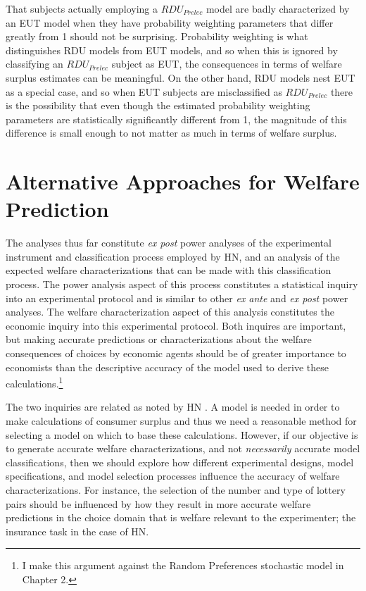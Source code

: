 \documentclass[../main.tex]{subfiles}
\begin{document}
That subjects actually employing a $\mathit{RDU_{Prelec}}$ model are badly characterized by an EUT model when they have probability weighting parameters that differ greatly from 1 should not be surprising.
Probability weighting is what distinguishes RDU models from EUT models, and so when this is ignored by classifying an $\mathit{RDU_{Prelec}}$ subject as EUT, the consequences in terms of welfare surplus estimates can be meaningful.
On the other hand, RDU models nest EUT as a special case, and so when EUT subjects are misclassified as $\mathit{RDU_{Prelec}}$ there is the possibility that even though the estimated probability weighting parameters are statistically significantly different from 1, the magnitude of this difference is small enough to not matter as much in terms of welfare surplus.

\singlespacing
\section{Alternative Approaches for Welfare Prediction}
\doublespacing

The analyses thus far constitute \textit{ex post} power analyses of the experimental instrument and classification process employed by HN, and an analysis of the expected welfare characterizations that can be made with this classification process.
The power analysis aspect of this process constitutes a statistical inquiry into an experimental protocol and is similar to other \textit{ex ante} and \textit{ex post} power analyses.
The welfare characterization aspect of this analysis constitutes the economic inquiry into this experimental protocol.
Both inquires are important, but making accurate predictions or characterizations about the welfare consequences of choices by economic agents should be of greater importance to economists than the descriptive accuracy of the model used to derive these calculations.\footnote{
	I make this argument against the Random Preferences stochastic model in Chapter 2.
}

The two inquiries are related as noted by HN \parencite*[105]{Harrison2016}.
A model is needed in order to make calculations of consumer surplus and thus we need a reasonable method for selecting a model on which to base these calculations.
However, if our objective is to generate accurate welfare characterizations, and not \textit{necessarily} accurate model classifications, then we should explore how different experimental designs, model specifications, and model selection processes influence the accuracy of welfare characterizations.
For instance, the selection of the number and type of lottery pairs should be influenced by how they result in more accurate welfare predictions in the choice domain that is welfare relevant to the experimenter; the insurance task in the case of HN.
\end{document}
